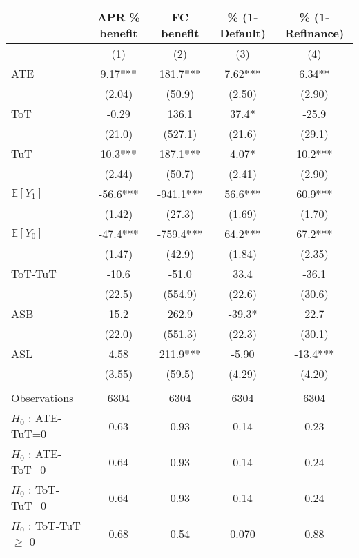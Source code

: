 \begin{tabular}{lcccc}
\toprule
      & APR \% benefit & FC benefit & \% (1-Default) & \% (1-Refinance) \\
\midrule
      & (1)   & (2)   & (3)   & (4) \\
\midrule
\midrule
ATE   & 9.17*** & 181.7*** & 7.62*** & 6.34** \\
      & (2.04) & (50.9) & (2.50) & (2.90) \\
ToT   & -0.29 & 136.1 & 37.4* & -25.9 \\
      & (21.0) & (527.1) & (21.6) & (29.1) \\
TuT   & 10.3*** & 187.1*** & 4.07* & 10.2*** \\
      & (2.44) & (50.7) & (2.41) & (2.90) \\
$\mathbb{E}[Y_1]$ & -56.6*** & -941.1*** & 56.6*** & 60.9*** \\
      & (1.42) & (27.3) & (1.69) & (1.70) \\
$\mathbb{E}[Y_0]$ & -47.4*** & -759.4*** & 64.2*** & 67.2*** \\
      & (1.47) & (42.9) & (1.84) & (2.35) \\
\midrule
ToT-TuT & -10.6 & -51.0 & 33.4  & -36.1 \\
      & (22.5) & (554.9) & (22.6) & (30.6) \\
ASB   & 15.2  & 262.9 & -39.3* & 22.7 \\
      & (22.0) & (551.3) & (22.3) & (30.1) \\
ASL   & 4.58  & 211.9*** & -5.90 & -13.4*** \\
      & (3.55) & (59.5) & (4.29) & (4.20) \\
      &       &       &       &  \\
\midrule
Observations & 6304  & 6304  & 6304  & 6304 \\
$H_0$ : ATE-TuT=0 & 0.63  & 0.93  & 0.14  & 0.23 \\
$H_0$ : ATE-ToT=0 & 0.64  & 0.93  & 0.14  & 0.24 \\
$H_0$ : ToT-TuT=0 & 0.64  & 0.93  & 0.14  & 0.24 \\
$H_0$ : ToT-TuT$\geq$ 0 & 0.68  & 0.54  & 0.070 & 0.88 \\
\bottomrule
\bottomrule
\end{tabular}%
